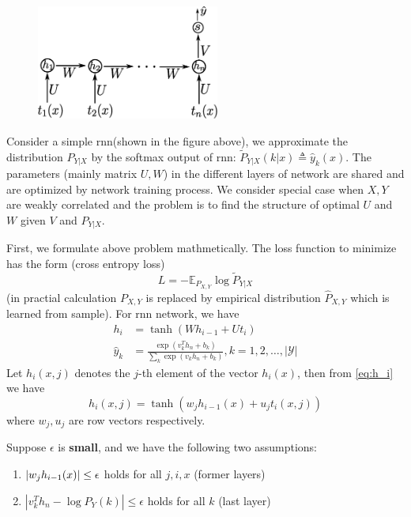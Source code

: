 \documentclass{article}
\DeclarePairedDelimiter\abs{\lvert}{\rvert}
\def\E{\mathbb{E}}
\def\Y{\mathcal{Y}}
\def\T{\mathrm{T}}
\begin{document}
\begin{figure}[!ht]
\centering
\includegraphics[width=6cm]{rnn.eps}
\end{figure}
Consider a simple rnn(shown in the figure above), we approximate the distribution $P_{Y|X}$ by the softmax output of rnn: $\tilde{P}_{Y|X}(k|x) \triangleq \hat{y}_k(x)$. The parameters (mainly matrix $U,W$) in the different layers of network are shared and are optimized by network training process. We consider special case when $X,Y$ are weakly correlated and the problem is to find the structure of optimal $U$ and $W$ given $V$ and $P_{Y|X}$.

First, we formulate above problem mathmetically. The loss function to minimize has the form (cross entropy loss) 
\begin{equation}\label{eq:cel}
L=-\E_{P_{X,Y}}\log \tilde{P}_{Y|X}
\end{equation}
(in practial calculation $P_{X,Y}$ is replaced by empirical distribution $\hat{P}_{X,Y}$ which is learned from sample). For rnn network, we have
\begin{subequations}
\begin{align}
\label{eq:h_i} h_i & =  \tanh (W h_{i-1} + U t_i)\\
\label{eq:last_layer} \hat{y}_k & = \frac{\exp(v^T_k h_n+b_k)}{\sum_k \exp(v_k h_n+b_k)},k=1,2,\dots,|\Y|
\end{align}
\end{subequations}
Let $h_i(x,j)$ denotes the $j$\hspace{-0.4pt}-th element of the vector $h_i(x)$, then from \eqref{eq:h_i} we have
\begin{equation}\label{eq:act_item}
h_i(x,j)= \tanh (w_j h_{i-1}(x)+u_j t_i(x,j))
\end{equation}
where $w_j,u_j$ are row vectors respectively.

Suppose $\epsilon$ is  \textbf{small}, and we have the following two assumptions:
\begin{enumerate}
\item $\abs{w_j h_{i-1}(x)}\leq \epsilon$ holds for all $j,i,x$ (former layers) 
\item $|v_k^Th_n-\log P_Y(k)|\leq \epsilon$ holds for all $k$ (last layer)
\end{enumerate}
\end{document}
